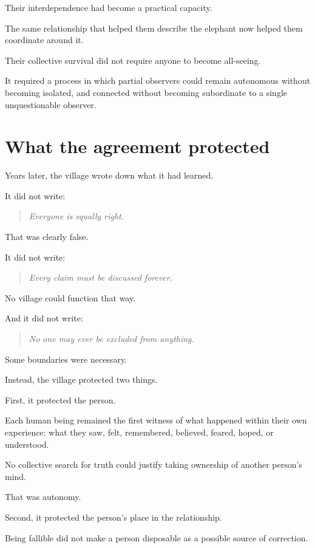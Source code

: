 \documentclass[11pt,a4paper]{article}
\begin{document}
Their interdependence had become a practical capacity.

The same relationship that helped them describe the elephant now helped them coordinate around it.

Their collective survival did not require anyone to become all-seeing.

It required a process in which partial observers could remain autonomous without becoming isolated, and connected without becoming subordinate to a single unquestionable observer.

\section*{What the agreement protected}

Years later, the village wrote down what it had learned.

It did not write:

\begin{quote}
\emph{Everyone is equally right.}
\end{quote}

That was clearly false.

It did not write:

\begin{quote}
\emph{Every claim must be discussed forever.}
\end{quote}

No village could function that way.

And it did not write:

\begin{quote}
\emph{No one may ever be excluded from anything.}
\end{quote}

Some boundaries were necessary.

Instead, the village protected two things.

First, it protected the person.

Each human being remained the first witness of what happened within their own experience: what they saw, felt, remembered, believed, feared, hoped, or understood.

No collective search for truth could justify taking ownership of another person's mind.

That was autonomy.

Second, it protected the person's place in the relationship.

Being fallible did not make a person disposable as a possible source of correction.
\end{document}
